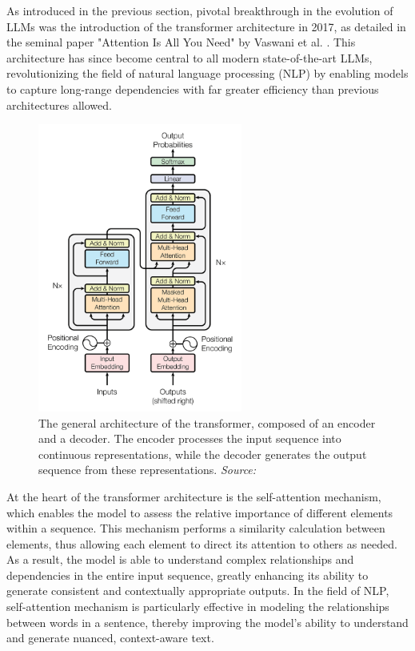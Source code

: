 As introduced in the previous section, pivotal breakthrough in the evolution of LLMs was the introduction of the transformer architecture in 2017, as detailed in the seminal paper "Attention Is All You Need" by Vaswani et al. \cite{vaswani2017attention}. This architecture has since become central to all modern state-of-the-art LLMs, revolutionizing the field of natural language processing (NLP) by enabling models to capture long-range dependencies with far greater efficiency than previous architectures allowed.

\begin{figure}[h!]
    \centering
    \includegraphics[width=0.6\textwidth]{images/llms/transformer-architecture.png}
    \caption{The general architecture of the transformer, composed of an encoder and a decoder. The encoder processes the input sequence into continuous representations, while the decoder generates the output sequence from these representations. \textit{Source:} \cite{vaswani2017attention}}
    \label{fig:transformer-architecture}
\end{figure}

At the heart of the transformer architecture is the self-attention mechanism, which enables the model to assess the relative importance of different elements within a sequence. This mechanism performs a similarity calculation between elements, thus allowing each element to direct its attention to others as needed. As a result, the model is able to understand complex relationships and dependencies in the entire input sequence, greatly enhancing its ability to generate consistent and contextually appropriate outputs. In the field of NLP, self-attention mechanism is particularly effective in modeling the relationships between words in a sentence, thereby improving the model's ability to understand and generate nuanced, context-aware text.

